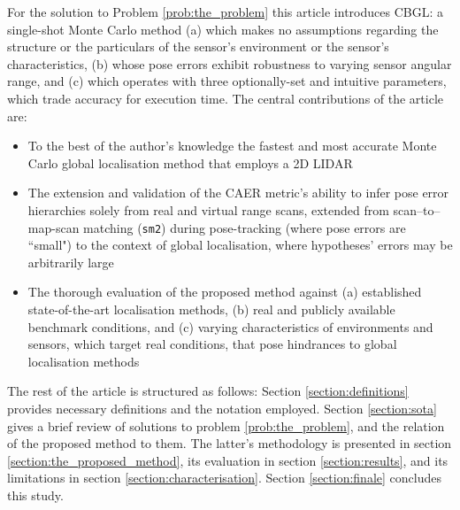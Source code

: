 For the solution to Problem \ref{prob:the_problem} this article introduces
CBGL: a single-shot Monte Carlo method
(a) which makes no assumptions regarding the structure or the particulars of the
sensor's environment or the sensor's characteristics,
(b) whose pose errors exhibit robustness to varying sensor angular range, and
(c) which operates with three optionally-set and intuitive parameters, which
trade accuracy for execution time.
The central contributions of the article are:
\begin{itemize}
  \item To the best of the author's knowledge the fastest and most accurate
        Monte Carlo global localisation method that employs a 2D LIDAR
  \item The extension and validation of the CAER metric's ability to infer
        pose error hierarchies solely from real and virtual range scans,
        extended from scan--to--map-scan matching (\texttt{sm2}) during
        pose-tracking (where pose errors are ``small") to the context of
        global localisation, where hypotheses' errors may be arbitrarily large
  \item The thorough evaluation of the proposed method against (a) established
        state-of-the-art localisation methods, (b) real and publicly available
        benchmark conditions, and (c) varying characteristics of environments
        and sensors, which target real conditions, that pose hindrances to
        global localisation methods
\end{itemize}

The rest of the article is structured as follows: Section
\ref{section:definitions} provides necessary definitions and the notation
employed. Section \ref{section:sota} gives a brief review of
solutions to problem \ref{prob:the_problem}, and the relation of the proposed
method to them. The latter's methodology is presented in section
\ref{section:the_proposed_method}, its evaluation in section
\ref{section:results}, and its limitations in section
\ref{section:characterisation}. Section \ref{section:finale} concludes this
study.
